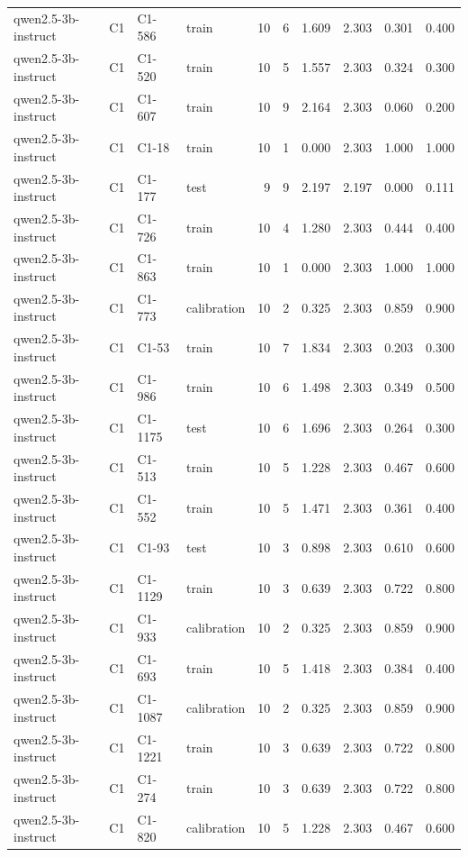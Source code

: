 \begin{table}
\begin{tabular}{llllrrrrrr}
qwen2.5-3b-instruct & C1 & C1-586 & train & 10 & 6 & 1.609 & 2.303 & 0.301 & 0.400 \\
qwen2.5-3b-instruct & C1 & C1-520 & train & 10 & 5 & 1.557 & 2.303 & 0.324 & 0.300 \\
qwen2.5-3b-instruct & C1 & C1-607 & train & 10 & 9 & 2.164 & 2.303 & 0.060 & 0.200 \\
qwen2.5-3b-instruct & C1 & C1-18 & train & 10 & 1 & 0.000 & 2.303 & 1.000 & 1.000 \\
qwen2.5-3b-instruct & C1 & C1-177 & test & 9 & 9 & 2.197 & 2.197 & 0.000 & 0.111 \\
qwen2.5-3b-instruct & C1 & C1-726 & train & 10 & 4 & 1.280 & 2.303 & 0.444 & 0.400 \\
qwen2.5-3b-instruct & C1 & C1-863 & train & 10 & 1 & 0.000 & 2.303 & 1.000 & 1.000 \\
qwen2.5-3b-instruct & C1 & C1-773 & calibration & 10 & 2 & 0.325 & 2.303 & 0.859 & 0.900 \\
qwen2.5-3b-instruct & C1 & C1-53 & train & 10 & 7 & 1.834 & 2.303 & 0.203 & 0.300 \\
qwen2.5-3b-instruct & C1 & C1-986 & train & 10 & 6 & 1.498 & 2.303 & 0.349 & 0.500 \\
qwen2.5-3b-instruct & C1 & C1-1175 & test & 10 & 6 & 1.696 & 2.303 & 0.264 & 0.300 \\
qwen2.5-3b-instruct & C1 & C1-513 & train & 10 & 5 & 1.228 & 2.303 & 0.467 & 0.600 \\
qwen2.5-3b-instruct & C1 & C1-552 & train & 10 & 5 & 1.471 & 2.303 & 0.361 & 0.400 \\
qwen2.5-3b-instruct & C1 & C1-93 & test & 10 & 3 & 0.898 & 2.303 & 0.610 & 0.600 \\
qwen2.5-3b-instruct & C1 & C1-1129 & train & 10 & 3 & 0.639 & 2.303 & 0.722 & 0.800 \\
qwen2.5-3b-instruct & C1 & C1-933 & calibration & 10 & 2 & 0.325 & 2.303 & 0.859 & 0.900 \\
qwen2.5-3b-instruct & C1 & C1-693 & train & 10 & 5 & 1.418 & 2.303 & 0.384 & 0.400 \\
qwen2.5-3b-instruct & C1 & C1-1087 & calibration & 10 & 2 & 0.325 & 2.303 & 0.859 & 0.900 \\
qwen2.5-3b-instruct & C1 & C1-1221 & train & 10 & 3 & 0.639 & 2.303 & 0.722 & 0.800 \\
qwen2.5-3b-instruct & C1 & C1-274 & train & 10 & 3 & 0.639 & 2.303 & 0.722 & 0.800 \\
qwen2.5-3b-instruct & C1 & C1-820 & calibration & 10 & 5 & 1.228 & 2.303 & 0.467 & 0.600 \\

\end{tabular}
\end{table}
